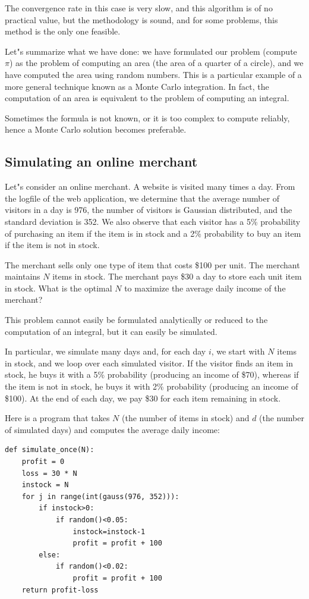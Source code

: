\documentclass[justified, sixbynine]{tufte-book}
\theoremstyle{plain}%
\newtheorem * {corollary}{Corollary}
\theoremstyle{definition}
\theoremstyle{remark}
\newtheorem * {remark}{Remark}
\newtheorem * {note}{Note}
\begin{document}
\begin{fullwidth}
The convergence rate in this case is very slow, and this algorithm is of no practical value, but the methodology is sound, and for some problems, this method is the only one feasible.

Let"s summarize what we have done: we have formulated our problem (compute $%
\pi $) as the problem of computing an area (the area of a quarter of a
circle), and we have computed the area using random numbers. This is a
particular example of a more general technique known as a Monte Carlo
integration. In fact, the computation of an area is equivalent to the problem
of computing an integral.

Sometimes the formula is not known, or it is too complex to compute reliably, hence a Monte Carlo solution becomes preferable.


\goodbreak\subsection{Simulating an online merchant}

Let"s consider an online merchant. A website is visited many times a day.
From the logfile of the web application, we determine
that the average number of visitors in a day is 976, the number of
visitors is Gaussian distributed, and the standard deviation is 352. We also observe that each visitor has a 5\% probability of purchasing an item
if the item is in stock and a 2\% probability to buy an item if the
item is not in stock.

The merchant sells only one type of item that costs \$100 per unit. The
merchant maintains $N$ items in stock. The merchant pays \$30 a day to store
each unit item in stock. What is the optimal $N$ to maximize the average
daily income of the merchant?

This problem cannot easily be formulated analytically or reduced to
the computation of an integral, but it can easily be simulated.

In particular, we simulate many days and, for each day $i$, 
we start with $N$ items
in stock, and we loop over each simulated visitor. If the visitor
finds an item in stock, he buys it with a 5\% probability
(producing an income of \$70), whereas if the item is not in stock, 
 he buys it with 2\% probability (producing an income of \$100).
At the end of each day, we pay \$30 for each item remaining in stock.

Here is a program that takes $N$ (the number of items in stock) and $d$ (the
number of simulated days) and computes the average daily income:
\begin{lstlisting}
def simulate_once(N):
    profit = 0
    loss = 30 * N
    instock = N
    for j in range(int(gauss(976, 352))):
        if instock>0:
            if random()<0.05:
                instock=instock-1
                profit = profit + 100
        else:
            if random()<0.02:
                profit = profit + 100
    return profit-loss


\end{lstlisting}
\end{fullwidth}
\end{document}
